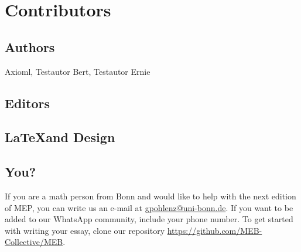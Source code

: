 \section*{Contributors} 

\subsection*{Authors}

Axioml, Testautor Bert, Testautor Ernie

\subsection*{Editors}
% 

\subsection*{\LaTeX and Design}

\subsection*{You?}

If you are a math person from Bonn and would like to help with the next edition of MEP, you can write us an e-mail at \href{mailto:gpohlenz@uni-bonn.de}{gpohlenz@uni-bonn.de}. If you want to be added to our WhatsApp community, include your phone number. To get started with writing your essay, clone our repository \url{https://github.com/MEB-Collective/MEB}. 









